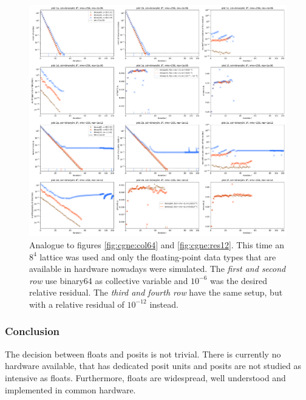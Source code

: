 \documentclass{article}
\theoremstyle{plain} %
\theoremstyle{convention} %
\theoremstyle{remark} %
\numberwithin{equation}{section}
\begin{document}
\begin{figure}[h]
    \centering
    \includegraphics[width=1.0\textwidth]{plots/cgne_8x8x8x8_new}
    \caption{Analogue to figures \ref{fig:cgne:col64} and \ref{fig:cgne:res12}. This time an $8^4$ lattice was used and only the floating-point data types that are available in hardware nowadays were simulated. The \textit{first and second row} use \gls{binary64} as collective variable and $10^{-6}$ was the desired relative residual. The \textit{third and fourth row} have the same setup, but with a relative residual of $10^{-12}$ instead.}
    \label{fig:cgne8}
\end{figure}

\subsubsection{Conclusion}

The decision between floats and posits is not trivial. There is currently no hardware available, that has dedicated posit units and posits are not studied as intensive as floats. Furthermore, floats are widespread, well understood and implemented in common hardware.

\end{document}
